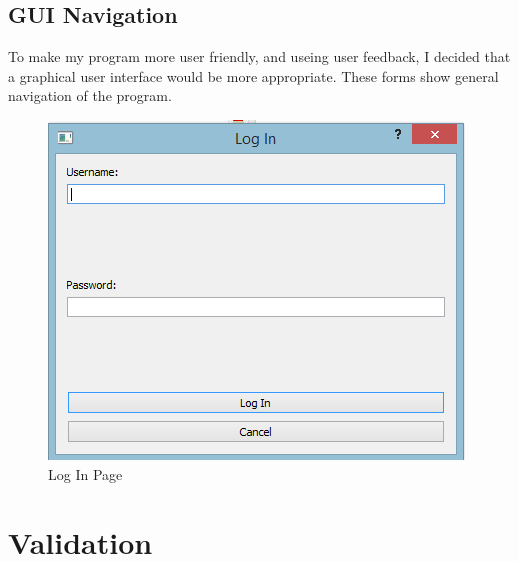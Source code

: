 \documentclass[a4paper,12pt]{report}
\begin{document}
\subsection{GUI Navigation}
To make my program more user friendly, and useing user feedback, I decided that a graphical user interface would be more appropriate. These forms show general navigation of the program.\\

\begin{figure}
\centering
\includegraphics{login}
\caption{Log In Page}
\label{fig:login}
\end{figure}



\section{Validation}
\end{document}
